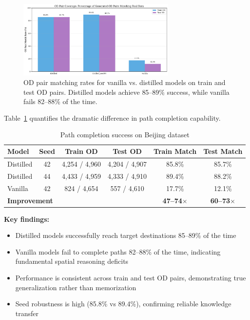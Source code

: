\begin{figure}[h]
    \centering
    \includegraphics[width=0.7\textwidth]{assets/plots/hoser/od_matching_rates.pdf}
    \caption{OD pair matching rates for vanilla vs. distilled models on train and test OD pairs. Distilled models achieve 85--89\% success, while vanilla fails 82--88\% of the time.}
    \label{fig:od-matching}
\end{figure}

Table~\ref{tab:od-results} quantifies the dramatic difference in path completion capability.

\begin{table}[h]
    \centering
    \caption{Path completion success on Beijing dataset}
    \label{tab:od-results}
    \small
    \begin{tabular}{lccccc}
        \toprule
        \textbf{Model}                           & \textbf{Seed}           & \textbf{Train OD}       & \textbf{Test OD} & \textbf{Train Match} & \textbf{Test Match} \\
        \midrule
        Distilled                                & 42                      & 4,254 / 4,960           & 4,204 / 4,907    & 85.8\%               & 85.7\%              \\
        Distilled                                & 44                      & 4,433 / 4,959           & 4,333 / 4,910    & 89.4\%               & 88.2\%              \\
        Vanilla                                  & 42                      & 824 / 4,654             & 557 / 4,610      & 17.7\%               & 12.1\%              \\
        \midrule
        \multicolumn{4}{l}{\textbf{Improvement}} & \textbf{47--74$\times$} & \textbf{60--73$\times$}                                                                 \\
        \bottomrule
    \end{tabular}
\end{table}

\textbf{Key findings:}
\begin{itemize}[noitemsep,topsep=0pt]
    \item Distilled models successfully reach target destinations 85--89\% of the time
    \item Vanilla models fail to complete paths 82--88\% of the time, indicating fundamental spatial reasoning deficits
    \item Performance is consistent across train and test OD pairs, demonstrating true generalization rather than memorization
    \item Seed robustness is high (85.8\% vs 89.4\%), confirming reliable knowledge transfer
\end{itemize}


